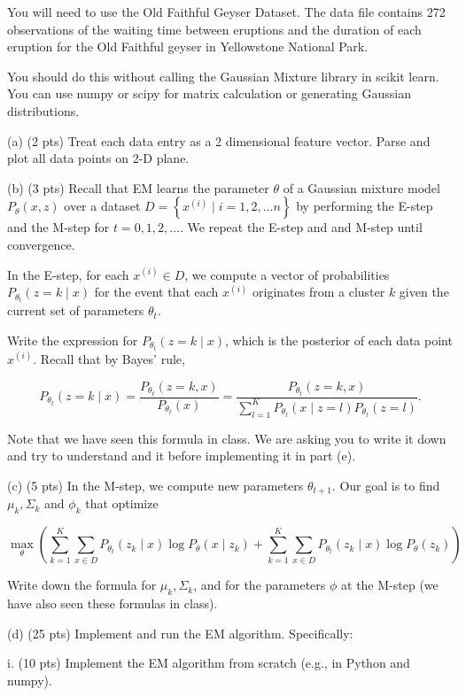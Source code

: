 \documentclass[10pt]{article}
\begin{document}
You will need to use the Old Faithful Geyser Dataset. The data file contains 272 observations of the waiting time between eruptions and the duration of each eruption for the Old Faithful geyser in Yellowstone National Park.

You should do this without calling the Gaussian Mixture library in scikit learn. You can use numpy or scipy for matrix calculation or generating Gaussian distributions.

(a) (2 pts) Treat each data entry as a 2 dimensional feature vector. Parse and plot all data points on 2-D plane.

(b) (3 pts) Recall that EM learns the parameter $\theta$ of a Gaussian mixture model $P_{\theta}(x, z)$ over a dataset $D=\left\{x^{(i)} \mid i=1,2, \ldots n\right\}$ by performing the E-step and the M-step for $t=0,1,2, \ldots$. We repeat the E-step and and $\mathrm{M}$-step until convergence.

In the E-step, for each $x^{(i)} \in D$, we compute a vector of probabilities $P_{\theta_{t}}(z=k \mid x)$ for the event that each $x^{(i)}$ originates from a cluster $k$ given the current set of parameters $\theta_{t}$.

Write the expression for $P_{\theta_{t}}(z=k \mid x)$, which is the posterior of each data point $x^{(i)}$. Recall that by Bayes' rule,

$$
P_{\theta_{t}}(z=k \mid x)=\frac{P_{\theta_{t}}(z=k, x)}{P_{\theta_{t}}(x)}=\frac{P_{\theta_{t}}(z=k, x)}{\sum_{l=1}^{K} P_{\theta_{t}}(x \mid z=l) P_{\theta_{t}}(z=l)} .
$$

Note that we have seen this formula in class. We are asking you to write it down and try to understand and it before implementing it in part (e).

(c) (5 pts) In the M-step, we compute new parameters $\theta_{t+1}$. Our goal is to find $\mu_{k}, \Sigma_{k}$ and $\phi_{k}$ that optimize

$$
\max _{\theta}\left(\sum_{k=1}^{K} \sum_{x \in D} P_{\theta_{t}}\left(z_{k} \mid x\right) \log P_{\theta}\left(x \mid z_{k}\right)+\sum_{k=1}^{K} \sum_{x \in D} P_{\theta_{t}}\left(z_{k} \mid x\right) \log P_{\theta}\left(z_{k}\right)\right)
$$

Write down the formula for $\mu_{k}, \Sigma_{k}$, and for the parameters $\phi$ at the M-step (we have also seen these formulas in class).

(d) (25 pts) Implement and run the EM algorithm. Specifically:

i. (10 pts) Implement the EM algorithm from scratch (e.g., in Python and numpy).
\end{document}
